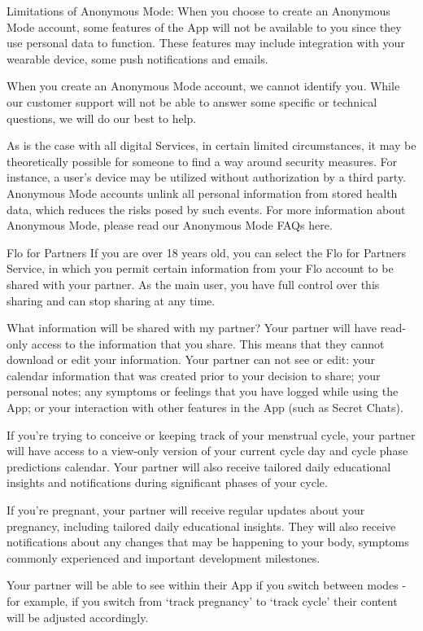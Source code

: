 Limitations of Anonymous Mode: When you choose to create an Anonymous Mode account, some features of the App will not be available to you since they use personal data to function. These features may include integration with your wearable device, some push notifications and emails. 

When you create an Anonymous Mode account, we cannot identify you. While our customer support will not be able to answer some specific or technical questions, we will do our best to help. 

As is the case with all digital Services, in certain limited circumstances, it may be theoretically possible for someone to find a way around security measures. For instance, a user’s device may be utilized without authorization by a third party. Anonymous Mode accounts unlink all personal information from stored health data, which reduces the risks posed by such events. For more information about Anonymous Mode, please read our Anonymous Mode FAQs here.

Flo for Partners
If you are over 18 years old, you can select the Flo for Partners Service, in which you permit certain information from your Flo account to be shared with your partner. As the main user, you have full control over this sharing and can stop sharing at any time.  

What information will be shared with my partner?
Your partner will have read-only access to the information that you share. This means that they cannot download or edit your information. Your partner can not see or edit: your calendar information that was created prior to your decision to share; your personal notes; any symptoms or feelings that you have logged while using the App; or your interaction with other features in the App (such as Secret Chats).

If you’re trying to conceive or keeping track of your menstrual cycle, your partner will have access to a view-only version of your current cycle day and cycle phase predictions calendar. Your partner will also receive tailored daily educational insights and notifications during significant phases of your cycle. 

If you’re pregnant, your partner will receive regular updates about your pregnancy, including tailored daily educational insights. They will also receive notifications about any changes that may be happening to your body, symptoms commonly experienced and important development milestones. 

Your partner will be able to see within their App if you switch between modes - for example, if you switch from ‘track pregnancy’ to ‘track cycle’ their content will be adjusted accordingly. 

